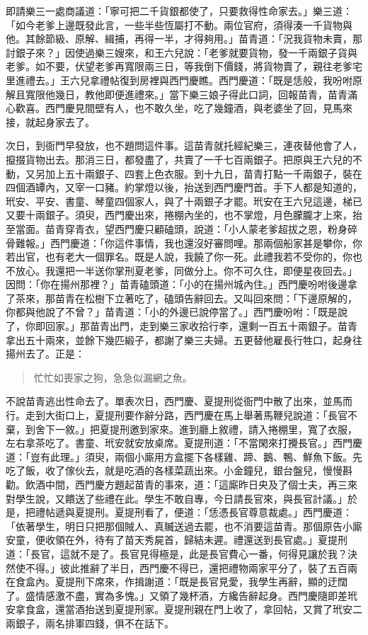 即請樂三一處商議道：「寧可把二千貨銀都使了，只要救得性命家去。」樂三道：「如今老爹上邊既發此言，一些半些恆屬打不動。兩位官府，須得湊一千貨物與他。其餘節級、原解、緝捕，再得一半，才得夠用。」苗青道：「況我貨物未賣，那討銀子來？」因使過樂三嫂來，和王六兒說：「老爹就要貨物，發一千兩銀子貨與老爹。如不要，伏望老爹再寬限兩三日，等我倒下價錢，將貨物賣了，親往老爹宅里進禮去。」王六兒拿禮帖復到房裡與西門慶瞧。西門慶道：「既是恁般，我吩咐原解且寬限他幾日，教他即便進禮來。」當下樂三娘子得此口詞，回報苗青，苗青滿心歡喜。西門慶見間壁有人，也不敢久坐，吃了幾鐘酒，與老婆坐了回，見馬來接，就起身家去了。

次日，到衙門早發放，也不題問這件事。這苗青就托經紀樂三，連夜替他會了人，攛掇貨物出去。那消三日，都發盡了，共賣了一千七百兩銀子。把原與王六兒的不動，又另加上五十兩銀子、四套上色衣服。到十九日，苗青打點一千兩銀子，裝在四個酒罈內，又宰一口豬。約掌燈以後，抬送到西門慶門首。手下人都是知道的，玳安、平安、書童、琴童四個家人，與了十兩銀子才罷。玳安在王六兒這邊，梯已又要十兩銀子。須臾，西門慶出來，捲棚內坐的，也不掌燈，月色朦朧才上來，抬至當面。苗青穿青衣，望西門慶只顧磕頭，說道：「小人蒙老爹超拔之恩，粉身碎骨難報。」西門慶道：「你這件事情，我也還沒好審問哩。那兩個船家甚是攀你，你若出官，也有老大一個罪名。既是人說，我饒了你一死。此禮我若不受你的，你也不放心。我還把一半送你掌刑夏老爹，同做分上。你不可久住，即便星夜回去。」因問：「你在揚州那裡？」苗青磕頭道：「小的在揚州城內住。」西門慶吩咐後邊拿了茶來，那苗青在松樹下立著吃了，磕頭告辭回去。又叫回來問：「下邊原解的，你都與他說了不曾？」苗青道：「小的外邊已說停當了。」西門慶吩咐：「既是說了，你即回家。」那苗青出門，走到樂三家收拾行李，還剩一百五十兩銀子。苗青拿出五十兩來，並餘下幾匹緞子，都謝了樂三夫婦。五更替他雇長行牲口，起身往揚州去了。正是：
\begin{quote}
忙忙如喪家之狗，急急似漏網之魚。
\end{quote}

不說苗青逃出性命去了。單表次日，西門慶、夏提刑從衙門中散了出來，並馬而行。走到大街口上，夏提刑要作辭分路，西門慶在馬上舉著馬鞭兒說道：「長官不棄，到舍下一敘。」把夏提刑邀到家來。進到廳上敘禮，請入捲棚里，寬了衣服，左右拿茶吃了。書童、玳安就安放桌席。夏提刑道：「不當閑來打攪長官。」西門慶道：「豈有此理。」須臾，兩個小廝用方盒擺下各樣雞、蹄、鵝、鴨、鮮魚下飯。先吃了飯，收了傢伙去，就是吃酒的各樣菜蔬出來。小金鐘兒，銀台盤兒，慢慢斟勸。飲酒中間，西門慶方題起苗青的事來，道：「這廝昨日央及了個士夫，再三來對學生說，又饋送了些禮在此。學生不敢自專，今日請長官來，與長官計議。」於是，把禮帖遞與夏提刑。夏提刑看了，便道：「恁憑長官尊意裁處。」西門慶道：「依著學生，明日只把那個賊人、真贓送過去罷，也不消要這苗青。那個原告小廝安童，便收領在外，待有了苗天秀屍首，歸結未遲。禮還送到長官處。」夏提刑道：「長官，這就不是了。長官見得極是，此是長官費心一番，何得見讓於我？決然使不得。」彼此推辭了半日，西門慶不得已，還把禮物兩家平分了，裝了五百兩在食盒內。夏提刑下席來，作揖謝道：「既是長官見愛，我學生再辭，顯的迂闊了。盛情感激不盡，實為多愧。」又領了幾杯酒，方纔告辭起身。西門慶隨即差玳安拿食盒，還當酒抬送到夏提刑家。夏提刑親在門上收了，拿回帖，又賞了玳安二兩銀子，兩名排軍四錢，俱不在話下。


